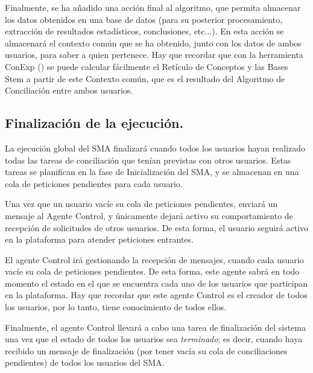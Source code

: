 Finalmente, se ha añadido una acción final al algoritmo, que permita almacenar los datos obtenidos en una base de datos (para su posterior procesamiento, extracción de resultados estadísticos, conclusiones, etc...). En esta acción se almacenará el contexto común que se ha obtenido, junto con los datos de ambos usuarios, para saber a quien pertenece. Hay que recordar que con la herramienta ConExp (\cite{conextp}) se puede calcular fácilmente el Retículo de Conceptos y las Bases Stem a partir de este Contexto común, que es el resultado del Algoritmo de Conciliación entre ambos usuarios.



\subsection{Finalización de la ejecución.}

La ejecución global del SMA finalizará cuando todos los usuarios hayan realizado todas las tareas de conciliación que tenían previstas con otros usuarios. Estas tareas se planifican en la fase de Inicialización del SMA, y se almacenan en una cola de peticiones pendientes para cada usuario.

Una vez que un usuario vacíe su cola de peticiones pendientes, enviará un mensaje al Agente Control, y únicamente dejará activo su comportamiento de recepción de solicitudes de otros usuarios. De esta forma, el usuario seguirá activo en la plataforma para atender peticiones entrantes.

El agente Control irá gestionando la recepción de mensajes, cuando cada usuario vacíe su cola de peticiones pendientes. De esta forma, este agente sabrá en todo momento el estado en el que se encuentra cada uno de los usuarios que participan en la plataforma. Hay que recordar que este agente Control es el creador de todos los usuarios, por lo tanto, tiene conocimiento de todos ellos.

Finalmente, el agente Control llevará a cabo una tarea de finalización del sistema una vez que el estado de todos los usuarios sea \emph{terminado}; es decir, cuando haya recibido un mensaje de finalización (por tener vacía su cola de conciliaciones pendientes) de todos los usuarios del SMA.

















